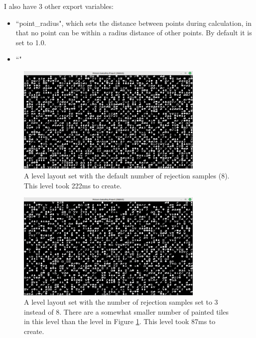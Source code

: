 \newpage

I also have 3 other export variables:

\begin{itemize}
    \item ``point\_radius", which sets the distance between points during calculation, in that no point can be within a radius distance of other points. By default it is set to 1.0.
    \item ``"
\end{itemize}

\begin{figure}[H]
    \centering
    \includegraphics[width=0.8\textwidth]{Images/default-poisson-result.png}
    \caption{A level layout set with the default number of rejection samples (8). This level took 222ms to create.}
    \label{fig:poisson1}
\end{figure}

\begin{figure}[H]
    \centering
    \includegraphics[width=0.8\textwidth]{Images/poisson-3-samples.png}
    \caption{A level layout set with the number of rejection samples set to 3 instead of 8. There are a somewhat smaller number of painted tiles in this level than the level in Figure \ref{fig:poisson1}. This level took 87ms to create.}
    \label{fig:poisson2}
\end{figure}

